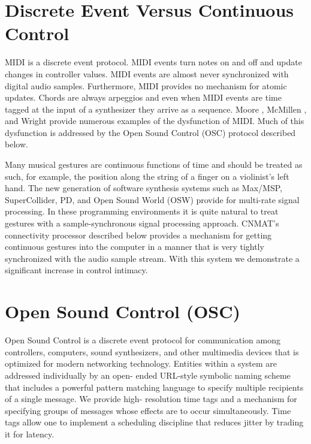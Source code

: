 \section{Discrete Event Versus Continuous Control}

MIDI is a discrete event protocol. MIDI events turn notes on and off and update changes in controller values. MIDI events are almost never synchronized with digital audio samples. Furthermore, MIDI provides no mechanism for atomic updates. Chords are always arpeggios and even when MIDI events are time tagged at the input of a synthesizer they arrive as a sequence. Moore \cite{Moore:1988}, McMillen \cite{McMillen:1994}, and Wright \cite{Wright:1994} provide numerous examples of the dysfunction of MIDI. Much of this dysfunction is addressed by the Open Sound Control (OSC) protocol described below.

Many musical gestures are continuous functions of time and should be treated as such, for example, the position along the string of a finger on a violinist's left hand. The new generation of software synthesis systems such as Max/MSP, SuperCollider, PD, and Open Sound World (OSW) provide for multi-rate signal processing. In these programming environments it is quite natural to treat gestures with a sample-synchronous signal processing approach. CNMAT's connectivity processor \cite{Freed:2000b} described below provides a mechanism for getting continuous gestures into the computer in a manner that is very tightly synchronized with the audio sample stream. With this system we demonstrate a significant increase in control intimacy.

\section{Open Sound Control (OSC)}

Open Sound Control is a discrete event protocol for communication among controllers, computers, sound synthesizers, and other multimedia devices that is optimized for modern networking technology. Entities within a system are addressed individually by an open- ended URL-style symbolic naming scheme that includes a powerful pattern matching language to specify multiple recipients of a single message. We provide high- resolution time tags and a mechanism for specifying groups of messages whose effects are to occur simultaneously. Time tags allow one to implement a scheduling discipline \cite{Dannenberg:1989} that reduces jitter by trading it for latency.

